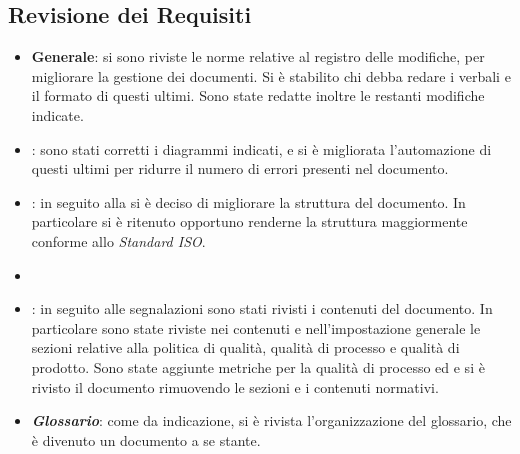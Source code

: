 \documentclass[12pt,a4paper]{article}
\begin{document}
\subsection{Revisione dei Requisiti}
\begin{itemize}
	\item \textbf{Generale}: si sono riviste le norme relative al registro delle modifiche, per migliorare la gestione dei documenti. Si è stabilito chi debba redare i verbali e il formato di questi ultimi. Sono state redatte inoltre le restanti modifiche indicate.
	\item \textbf{\AdR}: sono stati corretti i diagrammi indicati, e si è migliorata l'automazione di questi ultimi per ridurre il numero di errori presenti nel documento.
	\item \textbf{\NdP}: in seguito alla \RR si è deciso di migliorare la struttura del documento. In particolare si è ritenuto opportuno renderne la struttura maggiormente conforme allo \textit{Standard ISO}.
	\item \textbf{\PdP}
	\item \textbf{\PdQ}: in seguito alle segnalazioni sono stati rivisti i contenuti del documento. In particolare sono state riviste nei contenuti e nell'impostazione generale le sezioni relative alla politica di qualità, qualità di processo e qualità di prodotto. Sono state aggiunte metriche per la qualità di processo ed e si è rivisto il documento rimuovendo le sezioni e i contenuti normativi. 
	\item \textbf{\textit{Glossario}}: come da indicazione, si è rivista l'organizzazione del glossario, che è divenuto un documento a se stante. 
\end{itemize}
\newpage
\printglossary[title={Glossario}]
\end{document}
